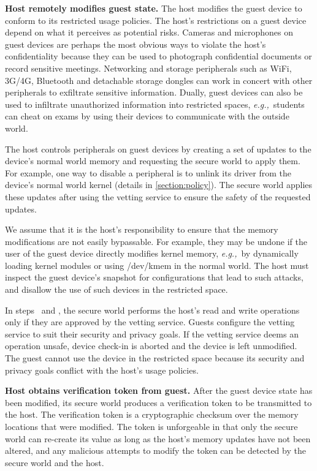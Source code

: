 \documentclass[pageno]{sig-alternate-05-2015}
\newcommand{\sectref}[1]{\autoref{#1}}
\newcommand{\emphitem}[1]{\textbf{#1}}
\newcommand*\circled[1]{\tikz[baseline=(char.base)]{
            \node[shape=circle,draw,inner sep=0.5pt] (char) {#1};}}
\newcounter{myctr}
\newenvironment{mylist}{\begin{list}{\textbf{\circled{\arabic{myctr}}}}
{\usecounter{myctr}
\setlength{\topsep}{1mm}\setlength{\itemsep}{0.5mm}
\setlength{\parsep}{0.5mm}
\setlength{\listparindent}{\parindent} %
\setlength{\itemindent}{0mm}\setlength{\partopsep}{0mm}
\setlength{\labelwidth}{-2mm}
\setlength{\leftmargin}{0mm}}}{\end{list}}
\newcommand{\eg}{\textit{e.g.,}}
\newcommand{\circtwo}  {\textbf{\circled{2}}}
\newcommand{\circthree}{\textbf{\circled{3}}}
\begin{document}
\begin{mylist}
\item \emphitem{Host remotely modifies guest state.} The host modifies the guest
device to conform to its restricted usage policies.  The host's restrictions on
a guest device depend on what it perceives as potential risks.  Cameras and
microphones on guest devices are perhaps the most obvious ways to violate the
host's confidentiality because they can be used to photograph confidential
documents or record sensitive meetings. Networking and storage peripherals such
as WiFi, 3G/4G, Bluetooth and detachable storage dongles can work in concert
with other peripherals to exfiltrate sensitive information. Dually, guest
devices can also be used to infiltrate unauthorized information into restricted
spaces, \eg~students can cheat on exams by using their devices to communicate
with the outside world.

The host controls peripherals on guest devices by creating a set of updates to
the device's normal world memory and requesting the secure world to apply them.
For example, one way to disable a peripheral is to unlink its driver from the
device's normal world kernel (details in \sectref{section:policy}).  The secure
world applies these updates after using the vetting service to ensure the
safety of the requested updates.

We assume that it is the host's responsibility to ensure that the memory
modifications are not easily bypassable. For example, they may be undone if the
user of the guest device directly modifies kernel memory, \eg~by dynamically
loading kernel modules or using \textsf{/dev/kmem} in the normal world. The
host must inspect the guest device's snapshot for configurations that lead to
such attacks, and disallow the use of such devices in the restricted space.

In steps \circtwo\ and \circthree, the secure world performs the host's read
and write operations only if they are approved by the vetting service. Guests
configure the vetting service to suit their security and privacy goals. If the
vetting service deems an operation unsafe, device check-in is aborted and the
device is left unmodified. The guest cannot use the device in the restricted
space because its security and privacy goals conflict with the host's usage
policies.

\item \emphitem{Host obtains verification token from guest.} After the guest
device state has been modified, its secure world produces a verification token
to be transmitted to the host. The verification token is a cryptographic
checksum over the memory locations that were modified. The token is unforgeable
in that only the secure world can re-create its value as long as the host's
memory updates have not been altered, and any malicious attempts to modify the
token can be detected by the secure world and the host.


\end{mylist}
\end{document}

